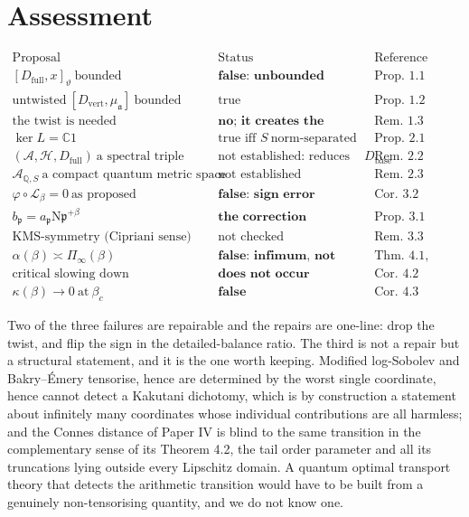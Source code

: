 \documentclass[11pt]{amsart}
\numberwithin{equation}{section}
\theoremstyle{definition}
\theoremstyle{remark}
\newcommand{\Q}{\mathbb{Q}}
\newcommand{\C}{\mathbb{C}}
\newcommand{\cA}{\mathcal{A}}
\newcommand{\cL}{\mathcal{L}}
\newcommand{\cH}{\mathcal{H}}
\newcommand{\pp}{\mathfrak{p}}
\newcommand{\aaa}{\mathfrak{a}}
\newcommand{\Ns}{\mathrm{N}}
\newcommand{\Db}{D_{\mathrm{base}}}
\newcommand{\Dv}{D_{\mathrm{vert}}}
\newcommand{\Df}{D_{\mathrm{full}}}
\begin{document}
\section{Assessment}

\[
\begin{array}{lll}
\text{Proposal} & \text{Status} & \text{Reference}\\\hline
[\Df,x]_\vartheta\ \text{bounded} & \textbf{false: unbounded} & \text{Prop.~1.1}\\
\text{untwisted}\ [\Dv,\mu_\aaa]\ \text{bounded} & \text{true} & \text{Prop.~1.2}\\
\text{the twist is needed} & \textbf{no; it creates the problem} & \text{Rem.~1.3}\\
\ker L=\C1 & \text{true iff }S\ \text{norm-separated} & \text{Prop.~2.1}\\
(\cA,\cH,\Df)\ \text{a spectral triple} & \text{not established: reduces to }\Db & \text{Rem.~2.2}\\
\cA_{\Q,S}\ \text{a compact quantum metric space} & \text{not established} & \text{Rem.~2.3}\\
\varphi\circ\cL_\beta=0\ \text{as proposed} & \textbf{false: sign error} & \text{Cor.~3.2}\\
b_\pp=a_\pp\Ns\pp^{+\beta} & \textbf{the correction} & \text{Prop.~3.1}\\
\text{KMS-symmetry (Cipriani sense)} & \text{not checked} & \text{Rem.~3.3}\\
\alpha(\beta)\asymp\Pi_\infty(\beta) & \textbf{false: infimum, not product} & \text{Thm.~4.1, Cor.~4.2}\\
\text{critical slowing down} & \textbf{does not occur} & \text{Cor.~4.2}\\
\kappa(\beta)\to0\ \text{at}\ \beta_c & \textbf{false} & \text{Cor.~4.3}
\end{array}
\]

Two of the three failures are repairable and the repairs are one-line: drop the twist, and
flip the sign in the detailed-balance ratio. The third is not a repair but a structural
statement, and it is the one worth keeping. Modified log-Sobolev and Bakry--\'Emery
tensorise, hence are determined by the worst single coordinate, hence cannot detect a
Kakutani dichotomy, which is by construction a statement about infinitely many coordinates
whose individual contributions are all harmless; and the Connes distance of Paper IV is
blind to the same transition in the complementary sense of its Theorem 4.2, the tail order
parameter and all its truncations lying outside every Lipschitz domain. A quantum optimal
transport theory that detects the arithmetic transition would have to be built from a
genuinely non-tensorising quantity, and we do not know one.
\end{document}
